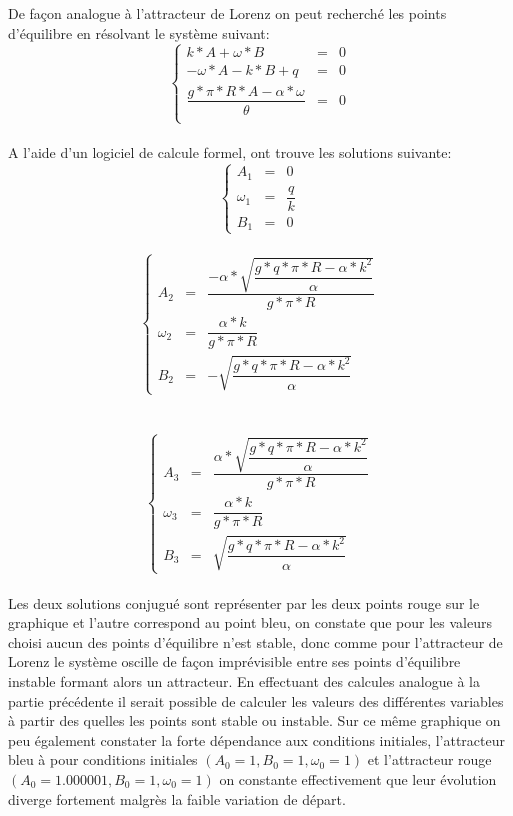 De façon analogue à l'attracteur de Lorenz on peut recherché les points d'équilibre en résolvant le système suivant:\\
\[
    \left\{
    \begin{array}{rcl}
        k*A+\omega*B&=&0\\
        -\omega*A-k*B+q&=&0\\
        \dfrac{g*\pi*R*A-\alpha*\omega}{\theta }&=&0\\
    \end{array}
    \right.
\]\\

A l'aide d'un logiciel de calcule formel, ont trouve les solutions suivante:\\
\[
    \left\{
    \begin{array}{rcl}
        A_1&=&0\\
        \omega_1&=&\dfrac{q}{k}\\
        B_1&=&0

    \end{array}
    \right.
\]\\

\[
    \left\{
    \begin{array}{rcl}
        A_2&=&\dfrac{-\alpha*\sqrt{\dfrac{g*q*\pi*R-\alpha*k^2}{\alpha}}}{g*\pi*R}\\
        \omega_2&=&\dfrac{\alpha*k}{g*\pi*R}\\
        B_2&=&-\sqrt{\dfrac{g*q*\pi*R-\alpha*k^2}{\alpha}}

    \end{array}
    \right.
\]\\
\\
\[
    \left\{
    \begin{array}{rcl}
        A_3&=&\dfrac{\alpha*\sqrt{\dfrac{g*q*\pi*R-\alpha*k^2}{\alpha}}}{g*\pi*R}\\
        \omega_3&=&\dfrac{\alpha*k}{g*\pi*R}\\
        B_3&=&\sqrt{\dfrac{g*q*\pi*R-\alpha*k^2}{\alpha}}

    \end{array}
    \right.
\]\\

Les deux solutions conjugué sont représenter par les deux points rouge sur le graphique et l'autre correspond au point bleu, on constate que pour les valeurs choisi aucun des points d'équilibre n'est stable, donc comme pour l'attracteur de Lorenz le système oscille de façon imprévisible entre ses points d'équilibre instable formant alors un attracteur. En effectuant des calcules analogue à la partie précédente il serait possible de calculer les valeurs des différentes variables à partir des quelles les points sont stable ou instable. 
Sur ce même graphique on peu également constater la forte dépendance aux conditions initiales, l'attracteur bleu à pour conditions initiales $(A_0=1,B_0=1,\omega_0=1)$ et l'attracteur rouge $(A_0=1.000001,B_0=1,\omega_0=1)$ on constante effectivement que leur évolution diverge fortement malgrès la faible variation de départ.


